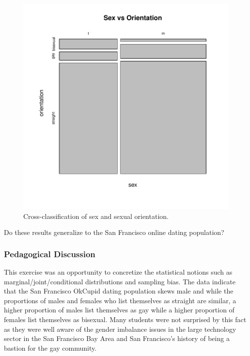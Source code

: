 \documentclass{article}\usepackage[]{graphicx}\usepackage[]{color}
\makeatletter
\def\maxwidth{ %
  \ifdim\Gin@nat@width>\linewidth
    \linewidth
  \else
    \Gin@nat@width
  \fi
}
\newenvironment{knitrout}{}{} %
\makeatother
\begin{document}
\begin{knitrout}
\begin{figure}
{\centering \includegraphics[width=\maxwidth]{figure/sex_by_orientation-1} 

}

\caption[Cross-classification of sex and sexual orientation]{Cross-classification of sex and sexual orientation.}\label{fig:sex_by_orientation}
\end{figure}


\end{knitrout}

Do these results generalize to the San Francisco online dating population?



\subsubsection{Pedagogical Discussion}
This exercise was an opportunity to concretize the statistical notions such as marginal/joint/conditional distributions and sampling bias.  The data indicate that the San Francisco OkCupid dating population skews male and while the proportions of males and females who list themselves as straight are similar, a higher proportion of males list themselves as gay while a higher proportion of females list themselves as bisexual.  Many students were not surprised by this fact as they were well aware of the gender imbalance issues in the large technology sector in the San Francisco Bay Area and San Francisco's history of being a bastion for the gay community.
\end{document}
